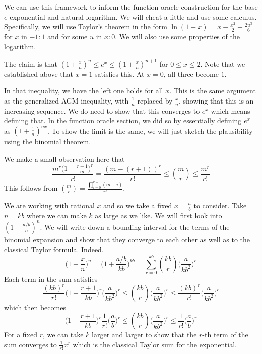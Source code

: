 \documentclass[12pt]{article}
\theoremstyle{remark}
\begin{document}
We can use this framework to inform the function oracle construction for the base $e$ exponential and natural logarithm. We will cheat a little and use some calculus. Specifically, we will use Taylor's theorem in the form $\ln(1+x) = x - \frac{x^2}{2} + \frac{2u^3}{6}$ for $x$ in $-1:1$ and for some $u$ in $x:0$. We will also use some properties of the logarithm. 

The claim is that $(1+\frac{x}{n})^n \leq e^x \leq (1+\frac{x}{n})^{n+1}$ for $0 \leq x \leq 2$. Note that we established above that $x=1$ satisfies this. At $x=0$, all three become $1$. 

In that inequality, we have the left one holds for all $x$. This is the same argument as the generalized AGM inequality, with $\frac{1}{n}$ replaced by $\frac{x}{n}$, showing that this is an increasing sequence. We do need to show that this converges to $e^x$ which means defining that. In the function oracle section, we did so by essentially defining $e^x$ as $(1+\frac{1}{n})^{nx}$. To show the limit is the same, we will just sketch the plausibility using the binomial theorem. 

We make a small observation here that $$\frac{m^r\bigg(1 - \frac{r+1}{m})^r}{r!} = \frac{(m - (r+1))^r}{r!} \leq \binom{m}{r} \leq \frac{m^r}{r!}$$ This follows from $\binom{m}{r} = \frac{\prod_{i=0}^{r+1} (m-i)}{r!}$. 

We are working with rational $x$ and so we take a fixed $x=\frac{a}{b}$ to consider. Take $n = kb$ where we can make $k$ as large as we like. We will first look into $(1+ \frac{a/b}{n})^n$. We will write down a bounding interval for the terms of the binomial expansion and show that they converge to each other as well as to the classical Taylor formula. Indeed, 
$$\bigg(1+\frac{x}{n}\bigg)^n = \bigg(1+ \frac{a/b}{kb}\bigg)^{kb} = \sum_{r=0}^{kb} \binom{kb}{r} \bigg(\frac{a}{kb^2}\bigg)^r$$
Each term in the sum satisfies 
$$\frac{(kb)^r}{r!} \bigg( 1 - \frac{r+1}{kb}\bigg)^r \bigg(\frac{a}{kb^2}\bigg)^r \leq \binom{kb}{r} \bigg(\frac{a}{kb^2}\bigg)^r \leq \frac{(kb)^r}{r!} \bigg(\frac{a}{kb^2}\bigg)^r$$ 
which then becomes
$$\bigg( 1 - \frac{r+1}{kb}\bigg)^r \frac{1}{r!} \bigg(\frac{a}{b}\bigg)^r \leq \binom{kb}{r} \bigg(\frac{a}{kb^2}\bigg)^r \leq \frac{1}{r!}\bigg(\frac{a}{b}\bigg)^r$$ 
For a fixed $r$, we can take $k$ larger and larger to show that the $r$-th term of the sum converges to $\frac{1}{r!}x^r$ which is the classical Taylor sum for the exponential. 
\end{document}
